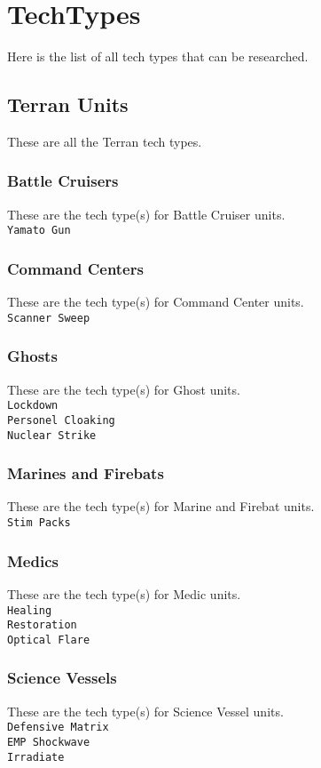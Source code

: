 \chapter{TechTypes}
\label{techtype}
Here is the list of all tech types that can be researched. 

\section{Terran Units}
These are all the Terran tech types.

\subsection{Battle Cruisers}
These are the tech type(s) for Battle Cruiser units. \\
\verb|Yamato Gun|

\subsection{Command Centers}
These are the tech type(s) for Command Center units. \\
\verb|Scanner Sweep| 

\subsection{Ghosts}
These are the tech type(s) for Ghost units. \\
\verb|Lockdown| \\
\verb|Personel Cloaking| \\
\verb|Nuclear Strike|

\subsection{Marines and Firebats}
These are the tech type(s) for Marine and Firebat units. \\
\verb|Stim Packs|

\subsection{Medics}
These are the tech type(s) for Medic units. \\
\verb|Healing| \\
\verb|Restoration| \\
\verb|Optical Flare|

\subsection{Science Vessels}
These are the tech type(s) for Science Vessel units. \\
\verb|Defensive Matrix| \\
\verb|EMP Shockwave| \\
\verb|Irradiate| 

